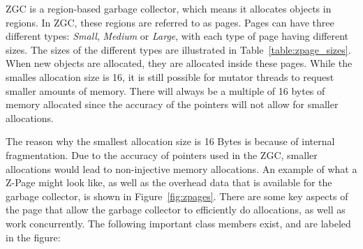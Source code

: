 ZGC is a region-based garbage collector, which means it allocates objects in regions. In ZGC, these regions are referred to as pages. Pages can have three different types: \textit{Small}, \textit{Medium} or \textit{Large}, with each type of page having different sizes. The sizes of the different types are illustrated in Table~\ref{table:zpage_sizes}. When new objects are allocated, they are allocated inside these pages. While the smalles allocation size is 16, it is still possible for mutator threads to request smaller amounts of memory. There will always be a multiple of 16 bytes of memory allocated since the accuracy of the pointers will not allow for smaller allocations.

The reason why the smallest allocation size is 16 Bytes is because of internal fragmentation. Due to the accuracy of pointers used in the ZGC, smaller allocations would lead to non-injective memory allocations. An example of what a Z-Page might look like, as well as the overhead data that is available for the garbage collector, is shown in Figure~\ref{fig:zpages}. There are some key aspects of the page that allow the garbage collector to efficiently do allocations, as well as work concurrently. The following important class members exist, and are labeled in the figure:
